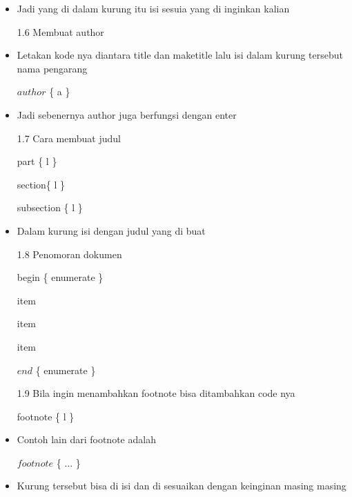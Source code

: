 \begin{itemize}
	\item Jadi yang di dalam kurung itu isi sesuia yang di inginkan kalian\par

1.6 Membuat author\par

	\item Letakan kode nya diantara title dan maketitle lalu isi dalam kurung tersebut nama pengarang\par

$author$ \{ a \} \par

	\item Jadi sebenernya author juga berfungsi dengan enter\par

1.7 Cara membuat judul\par

part \{ l \} \par

section\{ l \} \par

subsection \{ l \} \par

	\item Dalam kurung isi dengan judul yang di buat\par

1.8 Penomoran dokumen\par

begin \{ enumerate \} \par

item\par

item\par

item\par

$end$ \{ enumerate \} \par

1.9 Bila ingin menambahkan footnote bisa ditambahkan code nya\par

footnote \{ l \} \par

	\item Contoh lain dari footnote adalah\par

$footnote$ \{ $…$ \} \par

	\item Kurung tersebut bisa di isi dan di sesuaikan dengan keinginan masing masing\par


\end{itemize}
